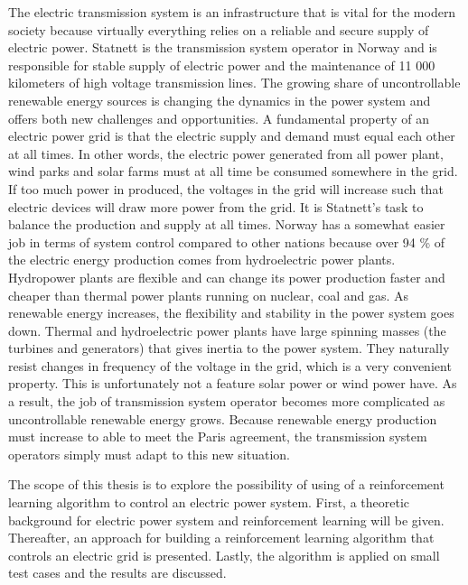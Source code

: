 \documentclass[class=book, crop=false]{standalone}
\begin{document}
The electric transmission system is an infrastructure that is vital for the modern society because virtually everything relies on a reliable and secure supply of electric power. Statnett is the transmission system operator in Norway and is responsible for stable supply of electric power and the  maintenance of 11 000 kilometers of high voltage transmission lines. The growing share of uncontrollable renewable energy sources is changing the dynamics in the power system and offers both new challenges and opportunities. A fundamental property of an electric power grid is that the electric supply and demand must equal each other at all times. In other words, the electric power generated from all power plant, wind parks and solar farms must at all time be consumed somewhere in the grid. If too much power in produced, the voltages in the grid will increase such that electric devices will draw more power from the grid. It is Statnett's task to balance the production and supply at all times. Norway has a somewhat easier job in terms of system control compared to other nations because over 94 \% of the electric energy production comes from hydroelectric power plants\cite{energifakta_norge}. Hydropower plants are flexible and can change its power production faster and cheaper than thermal power plants running on nuclear, coal and gas. As renewable energy increases, the flexibility and stability in the power system goes down. Thermal and hydroelectric power plants have large spinning masses (the turbines and generators) that gives inertia to the power system. They naturally resist changes in frequency of the voltage in the grid, which is a very convenient property. This is unfortunately not a feature solar power or wind power have. As a result, the job of transmission system operator becomes more complicated as uncontrollable renewable energy grows. Because renewable energy production must increase to able to meet the Paris agreement, the transmission system operators simply must adapt to this new situation.  


The scope of this thesis is to explore the possibility of using of a reinforcement learning algorithm to control an electric power system. First, a theoretic background for electric power system and reinforcement learning will be given. Thereafter, an approach for building a reinforcement learning algorithm that controls an electric grid is presented. Lastly, the algorithm is applied on small test cases and the results are discussed. 
\end{document}
